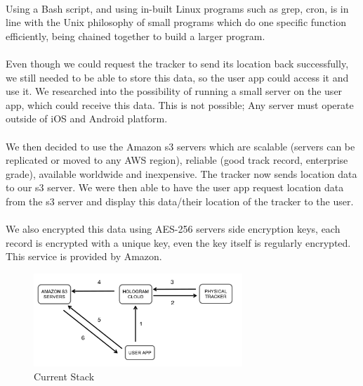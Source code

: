 \documentclass[12pt,a4paper]{article}
\begin{document}
        \paragraph{} Using a Bash script, and using in-built Linux programs such as grep, cron, is in line with the Unix philosophy of small programs which do one specific function efficiently, being chained together to build a larger program. 
        
        \paragraph{} Even though we could request the tracker to send its location back successfully, we still needed to be able to store this data, so the user app could access it and use it. We researched into the possibility of running a small server on the user app, which could receive this data. This is not possible; Any server must operate outside of iOS and Android platform.
        
        \paragraph{} We then decided to use the Amazon s3 servers which are scalable (servers can be replicated or moved to any AWS region), reliable (good track record, enterprise grade), available worldwide and inexpensive. The tracker now sends location data to our s3 server. We were then able to have the user app request location data from the s3 server and display this data/their location of the tracker to the user.
        
        \paragraph{} We also encrypted this data using AES-256 servers side encryption keys, each record is encrypted with a unique key, even the key itself is regularly encrypted. This service is provided by Amazon.
        
        \begin{figure}[H]
          \centering
          \includegraphics[width=0.7\textwidth]{../assets/design-implement-stage-current-stack.png}
          \caption{Current Stack}
          \label{fig:Current Stack}
        \end{figure}
\end{document}
